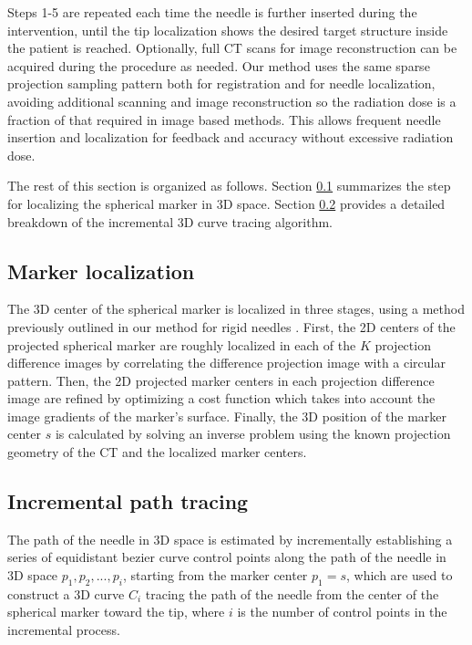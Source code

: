 \documentclass[letterpaper, 11 pt, conference]{ieeeconf} %
\begin{document}
Steps 1-5 are repeated each time the needle is further inserted during the intervention, until the tip localization shows the desired target structure inside the patient is reached. Optionally, full CT scans for image reconstruction can be acquired during the procedure as needed. Our method uses the same sparse projection sampling pattern both for registration and for needle localization, avoiding additional scanning and image reconstruction so the radiation dose is a fraction of that required in image based methods. This allows frequent needle insertion and localization for feedback and accuracy without excessive radiation dose.

The rest of this section is organized as follows.
Section \ref{markerloc} summarizes the step for localizing the spherical marker in 3D space.
Section \ref{inctracing} provides a detailed breakdown of the incremental 3D curve tracing algorithm.

\subsection{Marker localization} \label{markerloc}
The 3D center of the spherical marker is localized in three stages, using a method previously outlined in our method for rigid needles \cite{medan2017reduced}. 
First, the 2D centers of the projected spherical marker are roughly localized in each of the $K$ projection difference images by correlating the difference projection image with a circular pattern. 
Then, the 2D projected marker centers in each projection difference image are refined by optimizing a cost function which takes into account the image gradients of the marker's surface.
Finally, the 3D position of the marker center $s$ is calculated by solving an inverse problem using the known projection geometry of the CT and the localized marker centers.

\subsection{Incremental path tracing} \label{inctracing}

The path of the needle in 3D space is estimated by incrementally establishing a series of equidistant bezier curve control points along the path of the needle in 3D space $p_1, p_2, ..., p_i$, starting from the marker center $p_1=s$, which are used to construct a 3D curve $C_i$ tracing the path of the needle from the center of the spherical marker toward the tip, where $i$ is the number of control points in the incremental process. 
\end{document}
